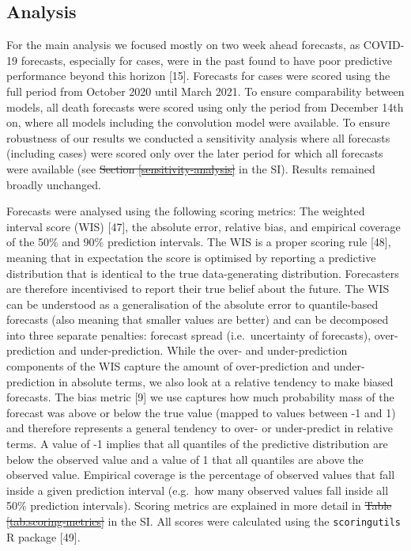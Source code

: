 \documentclass[10pt,letterpaper]{article}
\providecommand{\DIFaddtex}[1]{{\protect\color{blue}\uwave{#1}}} %
\providecommand{\DIFdeltex}[1]{{\protect\color{red}\sout{#1}}}                      %
\providecommand{\DIFaddbegin}{} %
\providecommand{\DIFaddend}{} %
\providecommand{\DIFdelbegin}{} %
\providecommand{\DIFdelend}{} %
\providecommand{\DIFadd}[1]{\texorpdfstring{\DIFaddtex{#1}}{#1}} %
\providecommand{\DIFdel}[1]{\texorpdfstring{\DIFdeltex{#1}}{}} %
\newcommand{\DIFscaledelfig}{0.5}
\newlength{\DIFdelgraphicswidth} %
\newlength{\DIFdelgraphicsheight} %
\newcommand{\DIFaddincludegraphics}[2][]{{\color{blue}\fbox{\DIFOincludegraphics[#1]{#2}}}} %
\newcommand{\DIFdelincludegraphics}[2][]{%
\sbox{\DIFdelgraphicsbox}{\DIFOincludegraphics[#1]{#2}}%
\settoboxwidth{\DIFdelgraphicswidth}{\DIFdelgraphicsbox} %
\settoboxtotalheight{\DIFdelgraphicsheight}{\DIFdelgraphicsbox} %
\scalebox{\DIFscaledelfig}{%
\parbox[b]{\DIFdelgraphicswidth}{\usebox{\DIFdelgraphicsbox}\\[-\baselineskip] \rule{\DIFdelgraphicswidth}{0em}}\llap{\resizebox{\DIFdelgraphicswidth}{\DIFdelgraphicsheight}{%
\setlength{\unitlength}{\DIFdelgraphicswidth}%
\begin{picture}(1,1)%
\thicklines\linethickness{2pt} %
{\color[rgb]{1,0,0}\put(0,0){\framebox(1,1){}}}%
{\color[rgb]{1,0,0}\put(0,0){\line( 1,1){1}}}%
{\color[rgb]{1,0,0}\put(0,1){\line(1,-1){1}}}%
\end{picture}%
}\hspace*{3pt}}} %
} %
\DeclareRobustCommand{\DIFaddbegin}{\DIFOaddbegin \let\includegraphics\DIFaddincludegraphics} %
\DeclareRobustCommand{\DIFaddend}{\DIFOaddend \let\includegraphics\DIFOincludegraphics} %
\DeclareRobustCommand{\DIFdelbegin}{\DIFOdelbegin \let\includegraphics\DIFdelincludegraphics} %
\DeclareRobustCommand{\DIFdelend}{\DIFOaddend \let\includegraphics\DIFOincludegraphics} %
\begin{document}
\hypertarget{analysis}{%
\subsection{Analysis}\label{analysis}}

For the main analysis we focused mostly on two week ahead forecasts, as
COVID-19 forecasts, especially for cases, were in the past found to have
poor predictive performance beyond this horizon {[}15{]}. Forecasts for
cases were scored using the full period from October 2020 until March
2021. To ensure comparability between models, all death forecasts were
scored using only the period from December 14th on, where all models
including the convolution model were available. To ensure robustness of
our results we conducted a sensitivity analysis where all forecasts
(including cases) were scored only over the later period for which all
forecasts were available (see \DIFdelbegin \DIFdel{Section \ref{sensitivity-analysis} }\DIFdelend \DIFaddbegin {} \DIFadd{and
} \DIFadd{and }\DIFadd{s
}\DIFaddend in the SI). Results remained broadly unchanged.

Forecasts were analysed using the following scoring metrics: The
weighted interval score (WIS) {[}47{]}, the absolute error, relative
bias, and empirical coverage of the 50\% and 90\% prediction intervals.
The WIS is a proper scoring rule {[}48{]}, meaning that in expectation
the score is optimised by reporting a predictive distribution that is
identical to the true data-generating distribution. Forecasters are
therefore incentivised to report their true belief about the future. The
WIS can be understood as a generalisation of the absolute error to
quantile-based forecasts (also meaning that smaller values are better)
and can be decomposed into three separate penalties: forecast spread
(i.e.~uncertainty of forecasts), over-prediction and under-prediction.
While the over- and under-prediction components of the WIS capture the
amount of over-prediction and under-prediction in absolute terms, we
also look at a relative tendency to make biased forecasts. The bias
metric {[}9{]} we use captures how much probability mass of the forecast
was above or below the true value (mapped to values between -1 and 1)
and therefore represents a general tendency to over- or under-predict in
relative terms. A value of -1 implies that all quantiles of the
predictive distribution are below the observed value and a value of 1
that all quantiles are above the observed value. Empirical coverage is
the percentage of observed values that fall inside a given prediction
interval (e.g.~how many observed values fall inside all 50\% prediction
intervals). Scoring metrics are explained in more detail in
\DIFdelbegin \DIFdel{Table
\ref{tab:scoring-metrics} }\DIFdelend \DIFaddbegin {} \DIFaddend in the SI. All scores were calculated
using the \texttt{scoringutils} R package {[}49{]}.
\end{document}
